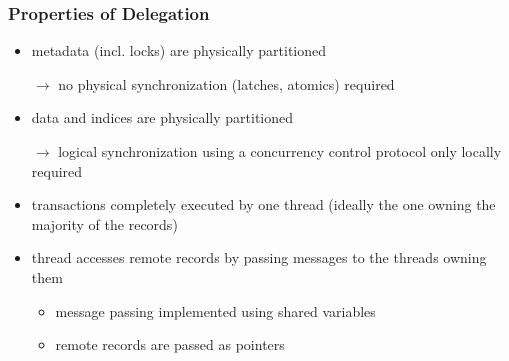 \begin{frame}
	\frametitle{Properties of Delegation}
	
	\begin{itemize}
		\item	metadata (incl. locks) are physically partitioned
		\item[$\rightarrow$]	no physical synchronization (latches, atomics) required
		\item	data and indices are physically partitioned
		\item[$\rightarrow$]	logical synchronization using a concurrency control protocol only locally required
		\item	transactions completely executed by one thread (ideally the one owning the majority of the records)
		\item	thread accesses remote records by passing messages to the threads owning them
						\begin{itemize}
							\item	message passing implemented using shared variables
							\item	remote records are passed as pointers
						\end{itemize}
	\end{itemize}
\end{frame}

